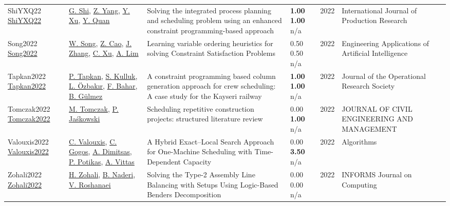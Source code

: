 {\begin{longtable}{p{3cm}p{5cm}p{10cm}p{1cm}rp{2.5cm}l}
ShiYXQ22 \href{https://doi.org/10.1080/00207543.2021.1963496}{ShiYXQ22} & \hyperref[auth:a446]{G. Shi}, \hyperref[auth:a447]{Z. Yang}, \hyperref[auth:a448]{Y. Xu}, \hyperref[auth:a449]{Y. Quan} & Solving the integrated process planning and scheduling problem using an enhanced constraint programming-based approach & \noindent{}\textbf{1.00} \textbf{1.00} n/a & 2022 & \cellcolor{red!20}International Journal of Production Research & \cite{ShiYXQ22}\\
Song2022 \href{http://dx.doi.org/10.1016/j.engappai.2021.104603}{Song2022} & \hyperref[auth:a1874]{W. Song}, \hyperref[auth:a1875]{Z. Cao}, \hyperref[auth:a1876]{J. Zhang}, \hyperref[auth:a1877]{C. Xu}, \hyperref[auth:a279]{A. Lim} & \cellcolor{green!10}Learning variable ordering heuristics for solving Constraint Satisfaction Problems & \noindent{}0.50 0.50 n/a & 2022 & Engineering Applications of Artificial Intelligence & \cite{Song2022}\\
Tapkan2022 \href{http://dx.doi.org/10.1080/01605682.2022.2125843}{Tapkan2022} & \hyperref[auth:a1787]{P. Tapkan}, \hyperref[auth:a1788]{S. Kulluk}, \hyperref[auth:a1789]{L. Özbakır}, \hyperref[auth:a1790]{F. Bahar}, \hyperref[auth:a1791]{B. Gülmez} & A constraint programming based column generation approach for crew scheduling: A case study for the Kayseri railway & \noindent{}\textbf{1.00} \textbf{1.00} n/a & 2022 & \cellcolor{red!20}Journal of the Operational Research Society & \cite{Tapkan2022}\\
Tomczak2022 \href{http://dx.doi.org/10.3846/jcem.2022.16943}{Tomczak2022} & \hyperref[auth:a1768]{M. Tomczak}, \hyperref[auth:a1769]{P. Jaśkowski} & \cellcolor{gold!20}Scheduling repetitive construction projects: structured literature review & \noindent{}\textcolor{black!50}{0.00} \textbf{1.00} n/a & 2022 & JOURNAL OF CIVIL ENGINEERING AND MANAGEMENT & \cite{Tomczak2022}\\
Valouxis2022 \href{http://dx.doi.org/10.3390/a15120450}{Valouxis2022} & \hyperref[auth:a1507]{C. Valouxis}, \hyperref[auth:a1508]{C. Gogos}, \hyperref[auth:a1509]{A. Dimitsas}, \hyperref[auth:a1510]{P. Potikas}, \hyperref[auth:a1511]{A. Vittas} & \cellcolor{gold!20}A Hybrid Exact–Local Search Approach for One-Machine Scheduling with Time-Dependent Capacity & \noindent{}\textcolor{black!50}{0.00} \textbf{3.50} n/a & 2022 & Algorithms & \cite{Valouxis2022}\\
Zohali2022 \href{http://dx.doi.org/10.1287/ijoc.2020.1015}{Zohali2022} & \hyperref[auth:a1526]{H. Zohali}, \hyperref[auth:a726]{B. Naderi}, \hyperref[auth:a728]{V. Roshanaei} & Solving the Type-2 Assembly Line Balancing with Setups Using Logic-Based Benders Decomposition & \noindent{}\textcolor{black!50}{0.00} \textcolor{black!50}{0.00} n/a & 2022 & \cellcolor{red!20}INFORMS Journal on Computing & \cite{Zohali2022}\\

\end{longtable}}
